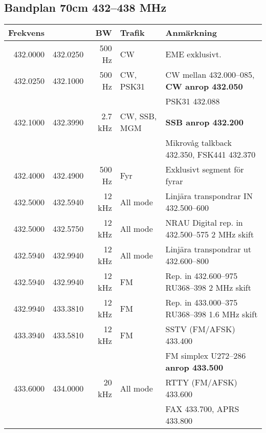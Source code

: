 \subsection{Bandplan 70cm 432--438 MHz}
\begin{tabular}{rrrll}
	\textbf{Frekvens} &          & \textbf{BW} & \textbf{Trafik} & \textbf{Anmärkning}                               \\ \hline

432.0000 & 432.0250 & 500 Hz  & CW           & EME exklusivt.                                    \\ \hline
432.0250 & 432.1000 & 500 Hz  & CW, PSK31    & CW mellan 432.000--085, \textbf{CW anrop 432.050} \\
         &          &         &              & PSK31 432.088                                     \\ \hline
432.1000 & 432.3990 & 2.7 kHz & CW, SSB, MGM & \textbf{SSB anrop 432.200}                        \\
         &          &         &              & Mikrovåg talkback 432.350, FSK441 432.370         \\ \hline
432.4000 & 432.4900 & 500 Hz  & Fyr          & Exklusivt segment för fyrar                       \\ \hline
432.5000 & 432.5940 & 12 kHz  & All mode     & Linjära transpondrar IN 432.500--600              \\ \hline
432.5000 & 432.5750 & 12 kHz  & All mode     & NRAU Digital rep. in 432.500--575 2 MHz skift     \\ \hline
432.5940 & 432.9940 & 12 kHz  & All mode     & Linjära transpondrar ut 432.600--800              \\ \hline
432.5940 & 432.9940 & 12 kHz  & FM           & Rep. in 432.600--975 RU368--398 2 MHz skift       \\ \hline
432.9940 & 433.3810 & 12 kHz  & FM           & Rep. in 433.000--375 RU368--398 1.6 MHz skift     \\ \hline
433.3940 & 433.5810 & 12 kHz  & FM           & SSTV (FM/AFSK) 433.400                            \\
         &          &         &              & FM simplex U272--286 \textbf{anrop 433.500}       \\ \hline
433.6000 & 434.0000 & 20 kHz  & All mode     & RTTY (FM/AFSK) 433.600                            \\
         &          &         &              & FAX 433.700, APRS 433.800                         \\ \hline

\end{tabular}
